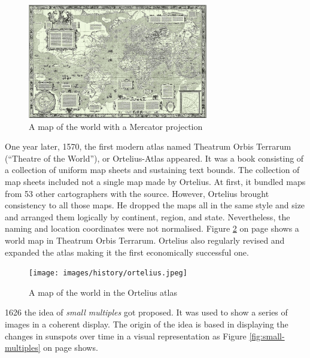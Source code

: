\begin{figure}[!htb]
\centering
\includegraphics[height=5cm,keepaspectratio]{images/history/mercator.png}
\caption[
    A map of the world with a Mercator projection, Urldate: 07.2016 \newline
\small\texttt{\url{https://upload.wikimedia.org/wikipedia/commons/b/b2/Mercator_1569.png}}
]{A map of the world with a Mercator projection}
\label{fig:mercator}
\end{figure}

One year later, 1570, the first modern atlas named Theatrum Orbis Terrarum (``Theatre of the World''), or Ortelius-Atlas appeared. It was a book consisting of a collection of uniform map sheets and sustaining text bounds. The collection of map sheets included not a single map made by Ortelius. At first, it bundled maps from 53 other cartographers with the source. However, Ortelius brought consistency to all those maps. He dropped the maps all in the same style and size and arranged them logically by continent, region, and state. Nevertheless, the naming and location coordinates were not normalised. Figure \ref{fig:ortelius} on page \pageref{fig:ortelius} shows a world map in Theatrum Orbis Terrarum. Ortelius also regularly revised and expanded the atlas making it the first economically successful one.

\begin{figure}[!htb]
\centering
\texttt{[image: images/history/ortelius.jpeg]}
\caption[
    A map of the world in the Ortelius atlas, Urldate: 07.2016 \newline
\small\texttt{\url{https://upload.wikimedia.org/wikipedia/commons/6/6f/OrteliusWorldMap.jpeg}}
]{A map of the world in the Ortelius atlas}
\label{fig:ortelius}
\end{figure}

1626 the idea of \textit{small multiples} got proposed. It was used to show a series of images in a coherent display. The origin of the idea is based in displaying the changes in sunspots over time in a visual representation as Figure \ref{fig:small-multiples} on page \pageref{fig:small-multiples} shows.

